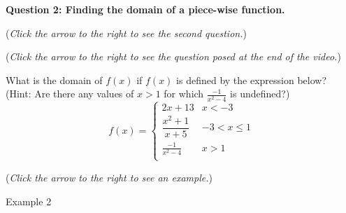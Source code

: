 \documentclass{ximera}
\begin{document}
\textbf{Question 2: Finding the domain of a piece-wise function.}
\begin{question}
\begin{flushright}
{\color{blue}(\emph{Click the arrow to the right to see the second question.})}
\end{flushright}
\begin{center}
\begin{expandable}
\begin{flushright}
{\color{blue}(\emph{Click the arrow to the right to see the  question
posed at the end of the video.})}
\end{flushright}
\begin{expandable}
What is the domain of $f(x)$ if $f(x)$ is defined by the expression below?  \\ (Hint: Are there any values of $x>1$ for which $\frac{-1}{x^2-4}$ is undefined?)\\

\[ f(x) = \begin{cases} 
      2x+13 & x<-3 \\
      \dfrac{x^2+1}{x+5} & -3< x\leq 1 \\
      \frac{-1}{x^2-4} & x> 1\\	
   \end{cases} \]

\begin{multipleChoice}
\choice{$(-\infty, -3]$}
\choice{$(-3, 1]$}
\choice{$[-3,-1]$}
\choice{$[1, \infty)$}
\choice{$(-\infty, -3) \cup (-3, 1]$}
\choice{$(-3, 1] \cup (1, \infty)$}
\choice{$(-\infty, -3) \cup (-3, 1] \cup [1, \infty)$}
\choice{$(-\infty, -3) \cup (-3, -2) \cup (-2, 1] \cup (1, 2) \cup (2, \infty)$}
\choice[correct]{$(-\infty, -3) \cup (-3, 1] \cup (1, 2) \cup (2, \infty)$}
\end{multipleChoice}

\begin{flushright}
{\color{blue}(\emph{Click the arrow to the right to see an example.})}
\end{flushright}
\begin{expandable}
\begin{center}
Example 2
\end{center}
\end{expandable}
\end{expandable}
\end{expandable}
\end{center}
\end{question}
\end{document}
